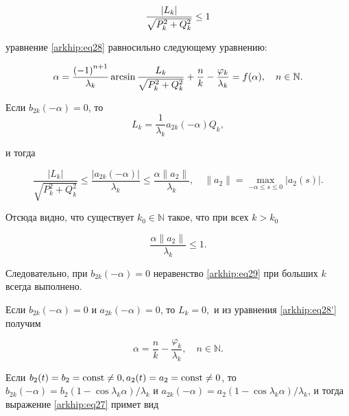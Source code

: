 \begin{equation}\label{arkhip:eq29}

\normalsize

\frac{|L_{k}|}{\sqrt{P_{k}^2 + Q_{k}^2}}\le 1

\end{equation}

уравнение \eqref{arkhip:eq28} равносильно следующему уравнению:

\begin{equation}\label{arkhip:eq28'}

\normalsize

\alpha = \frac{\left({-1}\right)^{n+1}}{\lambda_{k}}\arcsin{\frac{L_{k}}{\sqrt{P_{k}^2 + Q_{k}^2}}} + \displaystyle \frac{n}{k}-\displaystyle\frac{\varphi_{k}}{\lambda_{k}}=f(\alpha), \quad  n\in \mathbb N.

\end{equation}



Если  $b_{2 k}(-\alpha) = 0$, то $$L_{k}= \frac{1}{\lambda_{k}}a_{2 k}(-\alpha)Q_{k},$$ 

и тогда

$$\displaystyle \frac{|L_{k}|}{\sqrt{P_{k}^2 + Q_{k}^2}} \le \frac{|a_{2 k}(-\alpha)|}{\lambda_{k}}\le \frac{\alpha \| a_{2}\| }{\lambda_{k}}, \quad  \| a_{2}\|  = \max_{-\alpha\le s\le 0}|a_{2}\left(s\right)|.$$

Отсюда видно, что существует $k_{0}\in \mathbb N$ такое, что при всех $k>k_{0}$

$$ \displaystyle\frac{\alpha \| a_{2}\| }{\lambda_{k}}\le 1.$$



Следовательно, при $b_{2 k}(-\alpha)=0$ неравенство \eqref{arkhip:eq29}  при больших $k$ всегда выполнено.



Если $b_{2 k}(-\alpha) = 0$ и $a_{2 k}(-\alpha) = 0$, то $L_{k}=0,$ и из уравнения \eqref{arkhip:eq28'} получим

$$\alpha = \displaystyle\frac{n}{k}-\frac{\varphi_{k}}{\lambda_{k}}, \quad  n\in \mathbb N .$$





Если $b_{2}(t) = b_{2} = {\rm const}\ne 0, a_{2}(t) = a_{2} = {\rm const}\ne 0$, то $b_{2 k}(-\alpha) = b_{2}\left(1 - \cos{\lambda_{k} \alpha}\right)/{\lambda_{k}}$  и $a_{2 k}(-\alpha) = a_{2}\left(1 - \cos{\lambda_{k} \alpha}\right)/{\lambda_{k}}$, и тогда выражение \eqref{arkhip:eq27} примет вид

